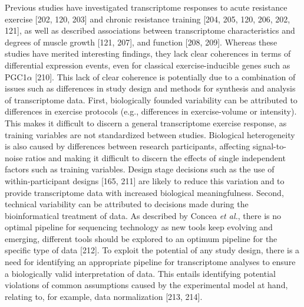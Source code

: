 \documentclass[twoside,10pt]{gihclass} %
\begin{document}
Previous studies have investigated transcriptome responses to acute resistance exercise {[}202, 120, 203{]}
and chronic resistance training {[}204, 205, 120, 206, 202, 121{]},
as well as described associations between transcriptome characteristics and degrees of muscle growth {[}121, 207{]},
and function {[}208, 209{]}.
Whereas these studies have merited interesting findings, they lack clear coherences in terms of differential expression events, even for classical exercise-inducible genes such as PGC1\(\alpha\) {[}210{]}.
This lack of clear coherence is potentially due to a combination of issues such as differences in study design and methods for synthesis and analysis of transcriptome data. First, biologically founded variability can be attributed to differences in exercise protocols (e.g., differences in exercise-volume or intensity). This makes it difficult to discern a general transcriptome exercise response, as training variables are not standardized between studies. Biological heterogeneity is also caused by differences between research participants, affecting signal-to-noise ratios and making it difficult to discern the effects of single independent factors such as training variables. Design stage decisions such as the use of within-participant designs {[}165, 211{]} are likely to reduce this variation and to provide transcriptome data with increased biological meaningfulness. Second, technical variability can be attributed to decisions made during the bioinformatical treatment of data. As described by Concea \emph{et al.}, there is no optimal pipeline for sequencing technology as new tools keep evolving and emerging, different tools should be explored to an optimum pipeline for the specific type of data {[}212{]}.
To exploit the potential of any study design, there is a need for identifying an appropriate pipeline for transcriptome analyses to ensure a biologically valid interpretation of data. This entails identifying potential violations of common assumptions caused by the experimental model at hand, relating to, for example, data normalization {[}213, 214{]}.
\end{document}
